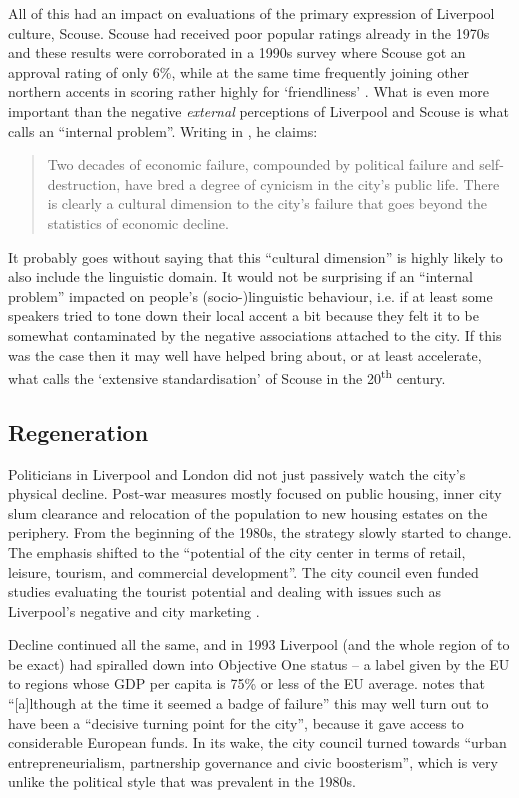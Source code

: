 All of this had an impact on evaluations of the primary expression of Liverpool culture, Scouse.
Scouse had received poor popular ratings already in the 1970s and these results were corroborated in a 1990s survey where Scouse got an approval rating of only 6\%, while at the same time frequently joining other northern accents in scoring rather highly for `friendliness' \citep[cf.][166]{wales2006}.
What is even more important than the negative \emph{external} perceptions of Liverpool and Scouse is what \citet[255]{parkinson1990} calls an ``internal  problem''.
Writing in \citeyear{parkinson1990}, he claims: 
	\begin{quote}
		Two decades of economic failure, compounded by political failure and self-destruction, have bred a degree of cynicism in the city's public life. There is clearly a cultural dimension to the city's failure that goes beyond the statistics of economic decline.
	\end{quote}
It probably goes without saying that this ``cultural dimension'' is highly likely to also include the linguistic domain.
It would not be surprising if an ``internal  problem'' impacted on people's (socio-)linguistic behaviour, i.e. if at least some speakers tried to tone down their local accent a bit because they felt it to be somewhat contaminated by the negative associations attached to the city.
If this was the case then it may well have helped bring about, or at least accelerate, what \citet{knowles1978} calls the `extensive standardisation' of Scouse in the 20\textsuperscript{th} century.

		\subsection{Regeneration}\label{sec.hist.20.regen}

Politicians in Liverpool and London did not just passively watch the city's physical decline.
Post-war measures mostly focused on public housing, inner city slum clearance and relocation of the population to new housing estates on the periphery.
From the beginning of the 1980s, the strategy slowly started to change.
The emphasis shifted to the ``potential of the city center in terms of retail, leisure, tourism, and commercial development''.
The city council even funded studies evaluating the tourist potential and dealing with issues such as Liverpool's negative  and city marketing \citep[cf.][250--253]{parkinson1990}.

Decline continued all the same, and in 1993 Liverpool (and the whole region of  to be exact) had spiralled down into Objective One status -- a label given by the EU to regions whose GDP per capita is 75\% or less of the EU average.
\citet[53--54]{belchem2006a} notes that ``[a]lthough at the time it seemed a badge of failure'' this may well turn out to have been a ``decisive turning point for the city'', because it gave access to considerable European funds.
In its wake, the city council turned towards ``urban entrepreneurialism, partnership governance and civic boosterism'', which is very unlike the political style that was prevalent in the 1980s.

